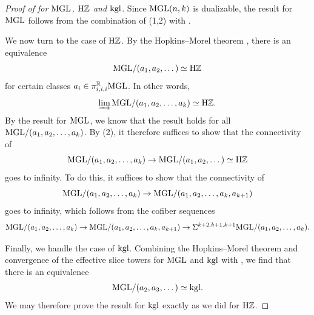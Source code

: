 %
%
%
\begin{proof}[Proof of  for $\mathrm{MGL}$, $\mathrm{H}\mathbb{Z}$ and $\mathrm{kgl}$]
  Since $\mathrm{MGL}(n,k)$ is dualizable, the result for $\mathrm{MGL}$ follows from the combination of (1,2) with .

  We now turn to the case of $\mathrm{H}\mathbb{Z}$.
  By the Hopkins--Morel theorem \cite{HM}, there is an equivalence
  \[ \mathrm{MGL} / (a_1, a_2, \dots) \simeq \mathrm{H}\mathbb{Z} \]
  for certain classes $a_i \in \pi_{i,i,i} ^{\mathbb{R}} \mathrm{MGL}$.
  In other words,
  \[\varinjlim \mathrm{MGL} / (a_1, a_2, \dots, a_k) \simeq \mathrm{H}\mathbb{Z}.\]
  By the result for $\mathrm{MGL}$, we know that the result holds for all $\mathrm{MGL} / (a_1, a_2, \dots, a_k)$. By (2), it therefore suffices to show that the connectivity of
  \[\mathrm{MGL} / (a_1, a_2, \dots, a_k) \to \mathrm{MGL} / (a_1, a_2, \dots) \simeq \mathrm{H}\mathbb{Z}\]
  goes to infinity.
  To do this, it suffices to show that the connectivity of
  \[\mathrm{MGL} / (a_1, a_2, \dots, a_k) \to \mathrm{MGL} / (a_1, a_2, \dots, a_k, a_{k+1})\]
  goes to infinity, which follows from the cofiber sequences
  \[\mathrm{MGL} / (a_1, a_2, \dots, a_k) \to \mathrm{MGL} / (a_1, a_2, \dots, a_k, a_{k+1}) \to \Sigma^{k+2, k+1,k+1} \mathrm{MGL} / (a_1, a_2, \dots, a_k).\]

  Finally, we handle the case of $\mathrm{kgl}$.
  Combining the Hopkins--Morel theorem and convergence of the effective slice towers for $\mathrm{MGL}$ and $\mathrm{kgl}$ \cite[Lemmas 8.10 and 8.11]{HM} with \cite[Proposition 5.4]{Spitzweck}, we find that there is an equivalence
  \[\mathrm{MGL} / (a_2, a_3, \dots) \simeq \mathrm{kgl}. \]
  We may therefore prove the result for $\mathrm{kgl}$ exactly as we did for $\mathrm{H}\mathbb{Z}$.
\end{proof}

